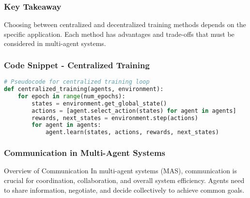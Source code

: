 \documentclass[aspectratio=169]{beamer}
\begin{document}
\begin{frame}[fragile]
    \frametitle{Key Takeaway}
    Choosing between centralized and decentralized training methods depends on the specific application. Each method has advantages and trade-offs that must be considered in multi-agent systems.
\end{frame}

\begin{frame}[fragile]
    \frametitle{Code Snippet - Centralized Training}
    \begin{lstlisting}[language=Python]
# Pseudocode for centralized training loop
def centralized_training(agents, environment):
    for epoch in range(num_epochs):
        states = environment.get_global_state()
        actions = [agent.select_action(states) for agent in agents]
        rewards, next_states = environment.step(actions)
        for agent in agents:
            agent.learn(states, actions, rewards, next_states)
    \end{lstlisting}
\end{frame}

\begin{frame}[fragile]
    \frametitle{Communication in Multi-Agent Systems}
    \begin{block}{Overview of Communication}
        In multi-agent systems (MAS), communication is crucial for coordination, collaboration, and overall system efficiency. Agents need to share information, negotiate, and decide collectively to achieve common goals.
    \end{block}
\end{frame}
\end{document}
